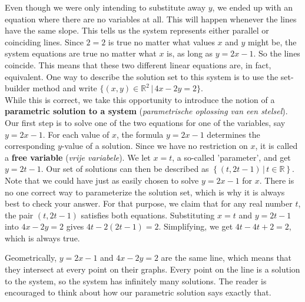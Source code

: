 \begin{example}
\begin{enumerate}
Even though we were only intending to substitute away $y$, we ended up with an equation where there are no variables at all. This will happen whenever the lines have the same slope. This tells us the system represents either parallel or coinciding lines. Since $2=2$ is true no matter what values $x$ and $y$ might be, the system equations are true no matter what $x$ is, as long as $y=2x-1$. So the lines coincide. This means that these two different linear equations are, in fact, equivalent.  
One way to describe the solution set to this system is to use the set-builder method and write $\{(x,y) \in \mathbb{R}^2 \, | \, 4x-2y = 2\}$.  \\
While this is correct, we take this opportunity to introduce the notion of a  \textbf{parametric solution to a system} (\textit{parametrische oplossing van een stelsel}).  Our first step is to solve one of the two equations for one of the variables, say $y = 2x-1$.  For each value of $x$, the formula $y = 2x-1$ determines the corresponding $y$-value of a solution.  Since we have no restriction on $x$, it is called a   \textbf{free variable} (\textit{vrije variabele}).  We let $x=t$, a so-called 'parameter', and get $y = 2t-1$. Our set of solutions can then be described as $\left\{ \left(t, 2t-1\right) \, | \, t \in \mathbb{R}\right\}$. Note that we could have just as easily chosen to solve $y=2x-1$ for $x$.  There is no one correct way to parameterize the solution set, which is why it is always best to check your answer. For that purpose, we claim that for any real number $t$, the pair $\left(t, 2 t - 1\right)$ satisfies both equations.  Substituting $x = t$ and $y =  2 t - 1$ into $4x-2y=2$ gives $4t - 2\left(2t-1\right) = 2$.  Simplifying, we get $4t - 4t + 2 = 2$, which is always true.  

Geometrically, $y=2x-1$ and $4x-2y=2$ are the same line, which means that they intersect at every point on their graphs. Every point on the line is a solution to the system, so the system has infinitely many solutions. The reader is encouraged to think about how our parametric solution says exactly that.


\end{enumerate}

\end{example}

